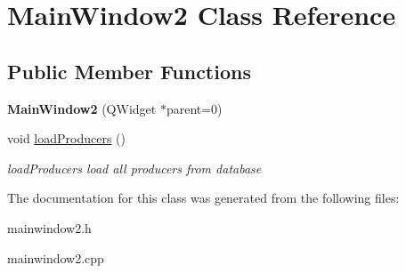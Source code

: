 \hypertarget{classMainWindow2}{\section{Main\-Window2 Class Reference}
\label{classMainWindow2}
}
\subsection*{Public Member Functions}
\begin{DoxyCompactItemize}
\item 
\hypertarget{classMainWindow2_aa59accd6b4465e4153c80750bf10c60b}{{\bfseries Main\-Window2} (Q\-Widget $\ast$parent=0)}\label{classMainWindow2_aa59accd6b4465e4153c80750bf10c60b}

\item 
\hypertarget{classMainWindow2_a4251fc9a153264c6a364c1387d9f10e5}{void \hyperlink{classMainWindow2_a4251fc9a153264c6a364c1387d9f10e5}{load\-Producers} ()}\label{classMainWindow2_a4251fc9a153264c6a364c1387d9f10e5}

\begin{DoxyCompactList}\small\item\em load\-Producers load all producers from database \end{DoxyCompactList}\end{DoxyCompactItemize}


The documentation for this class was generated from the following files\-:\begin{DoxyCompactItemize}
\item 
mainwindow2.\-h\item 
mainwindow2.\-cpp\end{DoxyCompactItemize}
